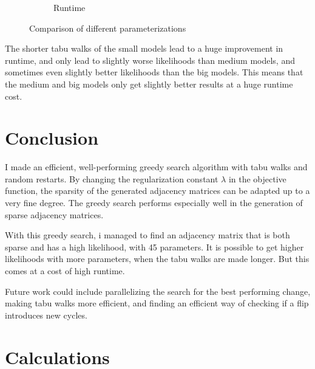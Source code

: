 \documentclass[sigconf, fleqn, prologue, dvipsnames]{acmart}
\def\ndy{%
    \reversemarginpar%
    \marginpar{\raggedleft\textcolor{red}{\rule{2mm}{2mm}}}%
}
\begin{document}
\begin{figure}
\begin{subfigure}{0.2\textwidth}
		\caption{Runtime}
		\label{fig:results:smaller:times}
	\end{subfigure}
	\caption{Comparison of different parameterizations}
	\label{fig:results:smaller:parameterizations}
\end{figure}

The shorter tabu walks of the small models lead to a huge improvement in runtime, and only lead to slightly worse likelihoods than medium models, and sometimes even slightly better likelihoods than the big models.
This means that the medium and big models only get slightly better results at a huge runtime cost.


\section{Conclusion}
I made an efficient, well-performing greedy search algorithm with tabu walks and random restarts.
By changing the regularization constant $\lambda$ in the objective function, the sparsity of the generated adjacency matrices can be adapted up to a very fine degree.
The greedy search performs especially well in the generation of sparse adjacency matrices.

With this greedy search, i managed to find an adjacency matrix that is both sparse and has a high likelihood, with 45 parameters.
It is possible to get higher likelihoods with more parameters, when the tabu walks are made longer. But this comes at a cost of high runtime.

Future work could include parallelizing the search for the best performing change, making tabu walks more efficient, and finding an efficient way of checking if a flip introduces new cycles.

\typeout{}

\ndy


\clearpage
\appendix
\section{Calculations}
\end{document}
